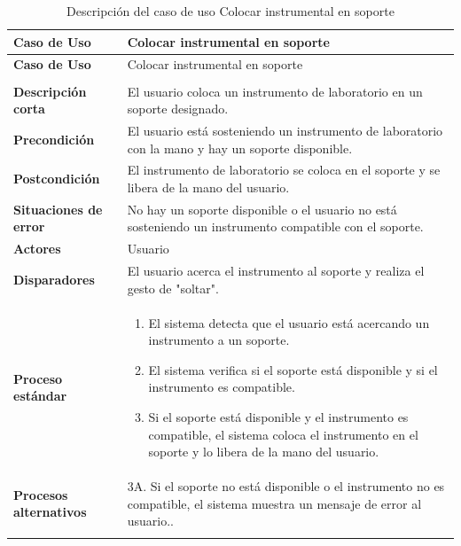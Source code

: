 \begin{longtable}{>{\raggedright\arraybackslash}m{} >{\raggedright\arraybackslash}m{}}
    \toprule\toprule
    \textbf{Caso de Uso} & Colocar instrumental en soporte \\
    \midrule\midrule
    \endfirsthead

    \toprule\toprule
    \textbf{Caso de Uso} & Colocar instrumental en soporte\\
    \midrule\midrule
    \endhead

    \midrule
    \multicolumn{2}{r}{\textit{Continúa en la siguiente página}} \\
    \midrule
    \endfoot

    \endlastfoot

    \textbf{Descripción corta} &El usuario coloca un instrumento de laboratorio en un soporte designado. \\
    \midrule
    \textbf{Precondición} & El usuario está sosteniendo un instrumento de laboratorio con la mano y hay un soporte disponible.\\
    \midrule
    \textbf{Postcondición} & El instrumento de laboratorio se coloca en el soporte y se libera de la mano del usuario. \\
    \midrule
    \textbf{Situaciones de error} & No hay un soporte disponible o el usuario no está sosteniendo un instrumento compatible con el soporte. \\
    \midrule
    \textbf{Actores} & Usuario \\
    \midrule
    \textbf{Disparadores} & El usuario acerca el instrumento al soporte y realiza el gesto de "soltar". \\
    \midrule
    \textbf{Proceso estándar} &
    \begin{enumerate}
        \item El sistema detecta que el usuario está acercando un instrumento a un soporte.
        \item El sistema verifica si el soporte está disponible y si el instrumento es compatible.
        \item Si el soporte está disponible y el instrumento es compatible, el sistema coloca el instrumento en el soporte y lo libera de la mano del usuario.
    \end{enumerate} \\
    \midrule
    \textbf{Procesos alternativos} & 3A. Si el soporte no está disponible o el instrumento no es compatible, el sistema muestra un mensaje de error al usuario..\\
    \midrule
    \caption{Descripción del caso de uso Colocar instrumental en soporte}
    \label{tab:Caso_de_uso_Colocar_instrumental_en_soporte}
\end{longtable}
\newpage
